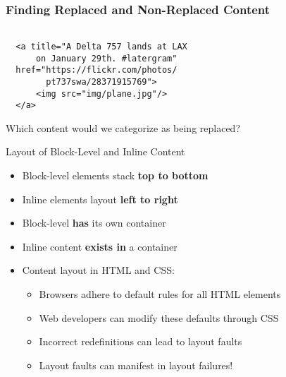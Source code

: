\documentclass[14pt,aspectratio=169]{beamer}
\begin{document}
%
\begin{frame}[fragile]
  \frametitle{Finding Replaced and Non-Replaced Content}
  \normalsize
  \begin{minipage}{6in}
    \vspace*{.2in}
    \begin{verbatim}

  <a title="A Delta 757 lands at LAX
      on January 29th. #latergram"
  href="https://flickr.com/photos/
        pt737swa/28371915769">
      <img src="img/plane.jpg"/>
  </a>

    \end{verbatim}
  \end{minipage}
  \vspace*{.1in}
  \begin{center}
    Which content would we categorize as being replaced?
  \end{center}
\end{frame}

%
\begin{frame}{Layout of Block-Level and Inline Content}
  \begin{itemize}
    \item Block-level elements stack {\bf top to bottom}
      \vspace*{-.2in}
    \item Inline elements layout {\bf left to right}
      \vspace*{-.2in}
    \item Block-level {\bf has} its own container
      \vspace*{-.2in}
    \item Inline content {\bf exists in} a container
      \vspace*{-.2in}
    \item Content layout in HTML and CSS:
      \begin{itemize}
        \item Browsers adhere to default rules for all HTML elements
        \item Web developers can modify these defaults through CSS
        \item Incorrect redefinitions can lead to layout faults
        \item Layout faults can manifest in layout failures!
      \end{itemize}
  \end{itemize}
\end{frame}
\end{document}
